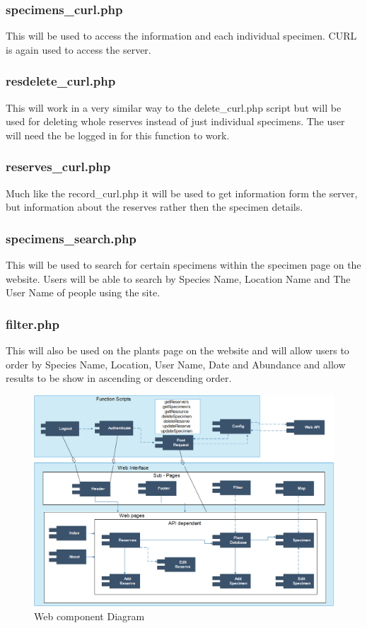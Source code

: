    \subsubsection{specimens\_curl.php}
        This will be used to access the information and each individual specimen. CURL is again used to access the server.

    \subsubsection{resdelete\_curl.php}
        This will work in a very similar way to the delete\_curl.php script but will be used for deleting whole reserves instead of just individual specimens. The user will need the be logged in for this function to work. 

    \subsubsection{reserves\_curl.php}
        Much like the record\_curl.php it will be used to get information form the server, but information about the reserves rather then the specimen details.

    \subsubsection{specimens\_search.php}
        This will be used to search for certain specimens within the specimen page on the website. Users will be able to search by Species Name, Location Name and The User Name of people using the site.

    \subsubsection{filter.php}
        This will also be used on the plants page on the website and will allow users to order by Species Name, Location, User Name, Date and Abundance and allow results to be show in ascending or descending order.

\begin{landscape}
    \begin{figure}
        \centering
        \includegraphics[scale=0.75]{web/webComponentDiagram.png}
        \caption{Web component Diagram}
        \label{fig:webComponentDiagram}
    \end{figure}
\end{landscape}



